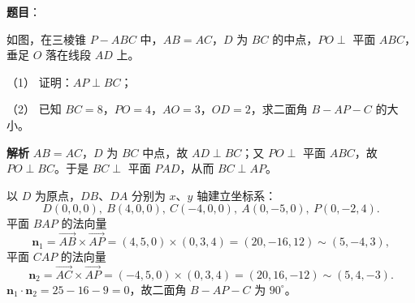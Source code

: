 \begin{answer}

\textbf{题目}：

如图，在三棱锥 $P-ABC$ 中，$AB=AC$，$D$ 为 $BC$ 的中点，$PO\perp$ 平面 $ABC$，垂足 $O$ 落在线段 $AD$ 上。

（1） 证明：$AP\perp BC$；

（2） 已知 $BC=8$，$PO=4$，$AO=3$，$OD=2$，求二面角 $B-AP-C$ 的大小。
\nopagebreak[4]
\begin{center}\end{center}
\nopagebreak[4]
\textbf{解析}
$AB=AC$，$D$ 为 $BC$ 中点，故 $AD\perp BC$；又 $PO\perp$ 平面 $ABC$，故 $PO\perp BC$。于是 $BC\perp$ 平面 $PAD$，从而 $BC\perp AP$。

以 $D$ 为原点，$DB$、$DA$ 分别为 $x$、$y$ 轴建立坐标系：
\nopagebreak[4]
\[D(0,0,0),\ B(4,0,0),\ C(-4,0,0),\ A(0,-5,0),\ P(0,-2,4).\]
平面 $BAP$ 的法向量
\nopagebreak[4]
\[\boldsymbol n_1=\overrightarrow{AB}\times\overrightarrow{AP}=(4,5,0)\times(0,3,4)=(20,-16,12)\sim(5,-4,3),\]
平面 $CAP$ 的法向量
\nopagebreak[4]
\[\boldsymbol n_2=\overrightarrow{AC}\times\overrightarrow{AP}=(-4,5,0)\times(0,3,4)=(20,16,-12)\sim(5,4,-3).\]
$\boldsymbol n_1\cdot\boldsymbol n_2=25-16-9=0$，故二面角 $B-AP-C$ 为 $90^\circ$。



\end{answer}
